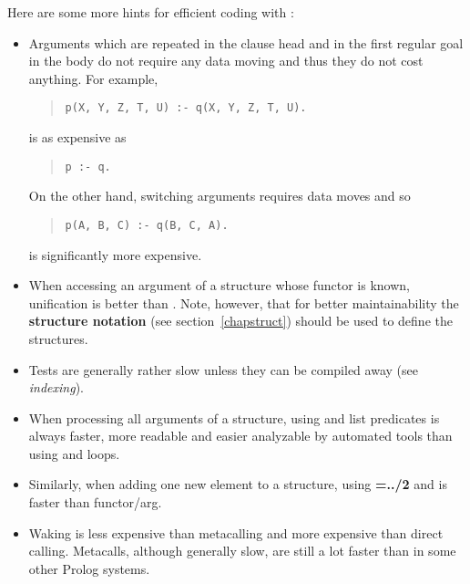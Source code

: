 Here are some more hints for efficient coding with {\eclipse}:
\begin{itemize}

\item Arguments which are repeated in the clause head and in the first
regular goal in the body do not require any data moving and thus
they do not cost anything. For example,
\begin{quote}
\begin{verbatim}
p(X, Y, Z, T, U) :- q(X, Y, Z, T, U).
\end{verbatim}
\end{quote}
is as expensive as
\begin{quote}
\begin{verbatim}
p :- q.
\end{verbatim}
\end{quote}
On the other hand, switching arguments requires data moves and so
\begin{quote}
\begin{verbatim}
p(A, B, C) :- q(B, C, A).
\end{verbatim}
\end{quote}
is significantly more expensive.

\item When accessing an argument of a
structure whose functor is known, unification
is better than .
Note, however, that for better maintainability the {\bf structure
notation} (see section~\ref{chapstruct})
should be used to define the structures.

\item Tests are generally rather slow unless they can be compiled away
(see {\it indexing}).
\item When processing all arguments of a structure, using 
and list predicates is always faster, more readable
and easier analyzable by automated tools than using 
and  loops.

\item Similarly, when adding one new element to a structure, using {\bf =../2}
and  is faster than functor/arg.

\item Waking is less expensive than metacalling and more expensive
than direct calling.
Metacalls, although generally slow, are still a lot faster than
in some other Prolog systems.


\end{itemize}
